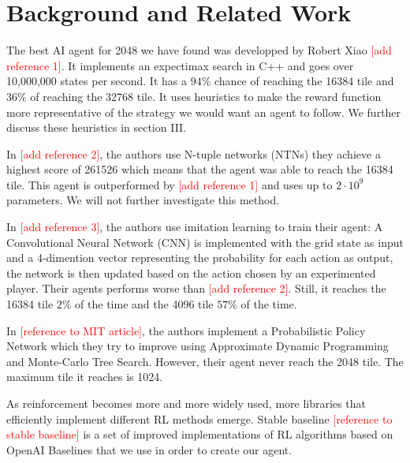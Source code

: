\documentclass[journal, a4paper]{IEEEtran}
\newcommand\todo[1]{\textcolor{red}{#1}}
\begin{document}


\section{Background and Related Work}

The best AI agent for 2048 we have found was developped by Robert Xiao \todo{[add reference 1]}. It implements an expectimax search in C++ and goes over 10,000,000 states per second. It has a $94\%$ chance of reaching the 16384 tile and $36\%$ of reaching the 32768 tile. It uses heuristics to make the reward function more representative of the strategy we would want an agent to follow. We further discuss these heuristics in section III.

In \todo{[add reference 2]}, the authors use N-tuple networks (NTNs) they achieve a highest score of 261526 which means that the agent was able to reach the 16384 tile. This agent is outperformed by \todo{[add reference 1]} and uses up to $2 \cdot 10^9$ parameters. We will not further investigate this method.

In \todo{[add reference 3]}, the authors use imitation learning to train their agent: A Convolutional Neural Network (CNN) is implemented with the grid state as input and a 4-dimention vector representing the probability for each action as output, the network is then updated based on the action chosen by an experimented player. Their agents performs worse than \todo{[add reference 2]}. Still, it reaches the 16384 tile $2\%$ of the time and the 4096 tile $57\%$ of the time.


In \todo{[reference to MIT article]}, the authors implement a Probabilistic Policy Network which they try to improve using Approximate Dynamic Programming and Monte-Carlo Tree Search. However, their agent never reach the 2048 tile. The maximum tile it reaches is 1024.

As reinforcement becomes more and more widely used, more libraries that efficiently implement different RL methods emerge. Stable baseline \todo{[reference to stable baseline]} is a set of improved implementations of RL algorithms based on OpenAI Baselines that we use in order to create our agent.
\end{document}
